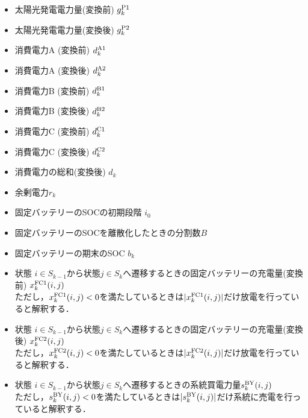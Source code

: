 \documentclass{jarticle}
\newcommand{\IB}{$\bullet$}
\newcommand{\IC}{$\circ$}
\begin{document}
 \begin{itemize}
  \item[\IB] 太陽光発電電力量(変換前) $g^{\rm P1}_{k}$
  \item[\IB] 太陽光発電電力量(変換後) $g^{\rm P2}_{k}$
  \item[\IB] 消費電力A (変換前) $d^{\rm A1}_{k}$
 \item[\IB] 消費電力A (変換後) $d^{\rm A2}_{k}$
  \item[\IB] 消費電力B (変換前) $d^{\rm B1}_{k}$
  \item[\IB] 消費電力B (変換後) $d^{\rm B2}_{k}$
 \item[\IB] 消費電力C (変換前) $d^{\rm C1}_{k}$
  \item[\IB] 消費電力C (変換後) $d^{\rm C2}_{k}$
  \item[\IB] 消費電力の総和(変換後) $d_{k}$
  \item[\IB]余剰電力$r_{k}$
  \item[\IB] 固定バッテリーのSOCの初期段階 $i_{0}$
  \item[\IB] 固定バッテリーのSOCを離散化したときの分割数$B$
  \item[\IC] 固定バッテリーの期末のSOC $b_{k}$
  \item[\IC] 状態 $i\in S_{k-1}$から状態$j\in S_k$へ遷移するときの固定バッテリーの充電量(変換前) $x^{\rm FC1}_{k}(i,j)$
  \\ただし，$x^{\rm FC1}_{k}(i,j) < 0$を満たしているときは$|x^{\rm FC1}_{k}(i,j)|$だけ放電を行っていると解釈する．
  \item[\IC] 状態 $i \in S_{k-1}$から状態$j \in S_{k}$へ遷移するときの固定バッテリーの充電量(変換後) $x^{\rm FC2}_{k}(i,j)$
   \\ただし，$x^{\rm FC2}_{k}(i,j) < 0$を満たしているときは$|x^{\rm FC2}_{k}(i,j)|$だけ放電を行っていると解釈する．

  \item[\IC]  状態 $i \in S_{k-1}$から状態$j \in S_{k}$へ遷移するときの系統買電力量$s^{\rm BY}_{k}(i,j)$  \\ただし，$s^{\rm BY}_{k}(i,j)< 0$を満たしているときは$|s^{\rm BY}_{k}(i,j) |$だけ系統に売電を行っていると解釈する．
  
\end{itemize}
\end{document}
